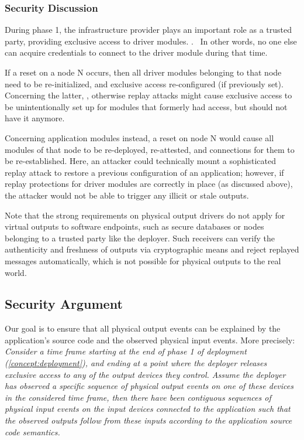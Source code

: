 \subsubsection{Security Discussion}
\label{concept:security-discussion}
%
During phase 1, the infrastructure provider plays an important role as a trusted
party, providing exclusive access to driver
modules. .~ In other words, no one else can acquire credentials to
connect to the driver module during that time.

If a reset on a node N occurs, then all driver modules belonging to that node
need to be re-initialized, and exclusive access re-configured (if previously
set). Concerning the latter, , otherwise replay attacks might cause exclusive access
to be unintentionally set up for modules that formerly had access, but should
not have it anymore.

Concerning application modules instead, a reset on node N would cause all
modules of that node to be re-deployed, re-attested, and connections for them to
be re-established. Here, an attacker could technically mount a sophisticated
replay attack to restore a previous configuration of an application; however, if
replay protections for driver modules are correctly in place (as discussed
above), the attacker would not be able to trigger any illicit or stale outputs. 

Note that the strong requirements on physical output drivers do not apply for
virtual outputs to software endpoints, such as secure databases or nodes
belonging to a trusted party like the deployer. Such receivers can verify the
authenticity and freshness of outputs via cryptographic means and reject
replayed messages automatically, which is not possible for physical outputs to
the real world.

\subsection{Security Argument}
%
Our goal is to ensure that all physical output events can be explained by the
application's source code and the observed physical input events. More
precisely:
%
\label{concept:security-property} %
%
\emph{ Consider a time frame starting at the end of phase 1 of deployment
  (\cref{concept:deployment}), and ending at a point where the deployer releases
  exclusive access to any of the output devices they control. Assume the
  deployer has observed a specific sequence of physical output events on one of
  these devices  in the considered time frame, then there have been
  contiguous sequences of physical input events on the input devices connected
  to the application such that the observed outputs follow from these inputs
  according to the application source code semantics.}

